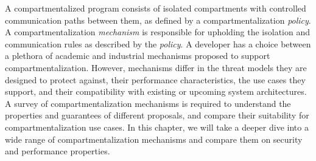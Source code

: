 A compartmentalized program consists of isolated compartments with controlled
communication paths between them, as defined by a 
compartmentalization \emph{policy}.
A compartmentalization \emph{mechanism} is responsible for upholding the
isolation and communication rules as described by the \emph{policy}.
A developer has a choice between a plethora of academic and industrial 
mechanisms\footnotemark
proposed to support compartmentalization.
However, mechanisms differ in the threat models they are designed to protect
against, their performance characteristics, the use cases they support, and
their compatibility with existing or upcoming system architectures.
A survey of compartmentalization mechanisms is required to understand the
properties and guarantees of different proposals, and compare their
suitability for compartmentalization use cases.
In this chapter, we will take a deeper dive into a wide range of 
compartmentalization mechanisms and compare them on security and performance
properties.




